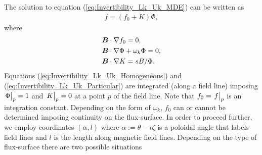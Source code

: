 The solution to equation (\ref{eq:Invertibility_Lk_Uk_MDE}) can be written as
%
\begin{align}
	f = (f_0 + K ) \Phi,
	\label{eq:Invertibility_Lk_Uk_Variation_of Constants}
\end{align}
where
%
\begin{align}
	& \vb*{B}\cdot \nabla f_0 = 0,  \label{eq:Invertibility_Lk_Uk_constant}
	\\
	& \vb*{B}\cdot \nabla \Phi + \omega_k \Phi = 0,  \label{eq:Invertibility_Lk_Uk_Homogeneous}
	\\
	& \vb*{B}\cdot \nabla K = {sB}/{\Phi}.  \label{eq:Invertibility_Lk_Uk_Particular}
\end{align}
Equations (\ref{eq:Invertibility_Lk_Uk_Homogeneous}) and (\ref{eq:Invertibility_Lk_Uk_Particular}) are integrated (along a field line) imposing $\eval{\Phi}_{p}=1$ and $\eval{K}_{p}=0$ at a point $p$ of the field line. Note that $f_0=\eval{f}_{p}$ is an integration constant. Depending on the form of $\omega_k$, $f_0$ can or cannot be determined imposing continuity on the flux-surface. In order to proceed further, we employ coordinates $(\alpha,l)$ where $\alpha:=\theta-\iota \zeta$ is a poloidal angle that labels field lines and $l$ is the length along magnetic field lines. Depending on the type of flux-surface there are two possible situations
%
